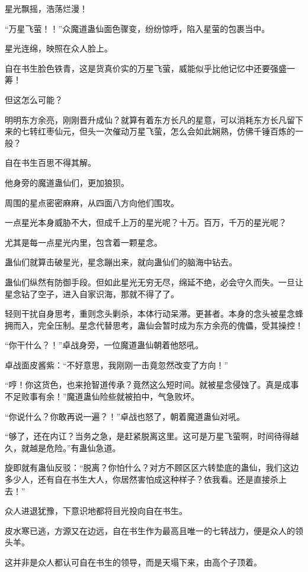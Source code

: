 \begin{this_body}
星光飘摇，浩荡烂漫！

“万星飞萤！！”众魔道蛊仙面色骤变，纷纷惊呼，陷入星萤的包裹当中。

星光连绵，映照在众人脸上。

自在书生脸色铁青，这是货真价实的万星飞萤，威能似乎比他记忆中还要强盛一筹！

但这怎么可能？

明明东方余亮，刚刚晋升成仙？就算有着东方长凡的星意，可以消耗东方长凡留下来的七转红枣仙元，但头一次催动万星飞萤，怎么会如此娴熟，仿佛千锤百炼的一般？

自在书生百思不得其解。

他身旁的魔道蛊仙们，更加狼狈。

周围的星点密密麻麻，从四面八方向他们围攻。

一点星光本身威胁不大，但成千上万的星光呢？十万。百万，千万的星光呢？

尤其是每一点星光内里，包含着一颗星念。

蛊仙们就算击破星光，星念蹦出来，就向蛊仙们的脑海中钻去。

蛊仙们纵然有防御手段。但如此星光无穷无尽，绵延不绝，必会守久而失。一旦让星念钻了空子，进入自家识海，那就不得了了。

轻则干扰自身思考，重则念头剿杀，本体行动呆滞。更甚者。本身的念头被星念蜂拥而入，完全压制。星念代替思考，蛊仙会暂时成为东方余亮的傀儡，受其操控！

“你干什么？！”卓战身旁，一位魔道蛊仙朝着他怒吼。

卓战面皮酱紫：“不好意思，我刚刚一击竟忽然改变了方向！”

“哼！你这货色，也来抢智道传承？竟然这么短时间。就被星念侵蚀了。真是成事不足败事有余！”魔道蛊仙险些就被拍中，气急败坏。

“你说什么？你敢再说一遍？！”卓战也怒了，朝着魔道蛊仙对吼。

“够了，还在内讧？当务之急，是赶紧脱离这里。这可是万星飞萤啊，时间待得越久，就越是危险。”有蛊仙急道。

旋即就有蛊仙反驳：“脱离？你怕什么？对方不顾区区六转垫底的蛊仙，我们这边多少人，还有自在书生大人，你居然害怕成这种样子？依我看。还是直接杀上去！”

众人进退犹豫，下意识地都将目光投向自在书生。

皮水寒已逃，方源又在边远，自在书生作为最高且唯一的七转战力，便是众人的领头羊。

这并非是众人都认可自在书生的领导，而是天塌下来，由高个子顶着。


\end{this_body}
